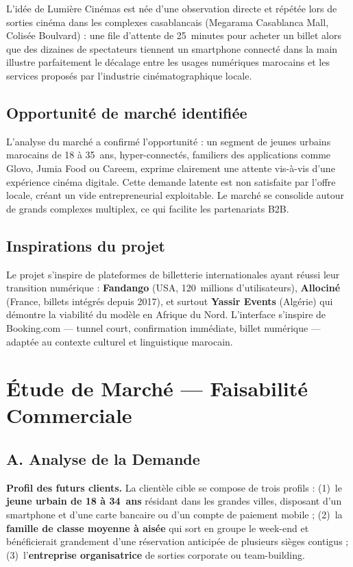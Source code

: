 \documentclass[12pt,a4paper,openany]{report}
\begin{document}
L'idée de Lumière Cinémas est née d'une observation directe et répétée lors de sorties cinéma dans les complexes casablancais (Megarama Casablanca Mall, Colisée Boulvard) : une file d'attente de 25~minutes pour acheter un billet alors que des dizaines de spectateurs tiennent un smartphone connecté dans la main illustre parfaitement le décalage entre les usages numériques marocains et les services proposés par l'industrie cinématographique locale.

\subsection{Opportunité de marché identifiée}

L'analyse du marché a confirmé l'opportunité : un segment de jeunes urbains marocains de 18 à 35~ans, hyper-connectés, familiers des applications comme Glovo, Jumia Food ou Careem, exprime clairement une attente vis-à-vis d'une expérience cinéma digitale. Cette demande latente est non satisfaite par l'offre locale, créant un vide entrepreneurial exploitable. Le marché se consolide autour de grands complexes multiplex, ce qui facilite les partenariats B2B.

\subsection{Inspirations du projet}

Le projet s'inspire de plateformes de billetterie internationales ayant réussi leur transition numérique : \textbf{Fandango} (USA, 120~millions d'utilisateurs), \textbf{Allociné} (France, billets intégrés depuis 2017), et surtout \textbf{Yassir Events} (Algérie) qui démontre la viabilité du modèle en Afrique du Nord. L'interface s'inspire de Booking.com — tunnel court, confirmation immédiate, billet numérique — adaptée au contexte culturel et linguistique marocain.

\section{Étude de Marché — Faisabilité Commerciale}

\subsection{A. Analyse de la Demande}

\textbf{Profil des futurs clients.}
La clientèle cible se compose de trois profils : (1)~le \textbf{jeune urbain de 18 à 34~ans} résidant dans les grandes villes, disposant d'un smartphone et d'une carte bancaire ou d'un compte de paiement mobile ; (2)~la \textbf{famille de classe moyenne à aisée} qui sort en groupe le week-end et bénéficierait grandement d'une réservation anticipée de plusieurs sièges contigus ; (3)~l'\textbf{entreprise organisatrice} de sorties corporate ou team-building.
\end{document}
